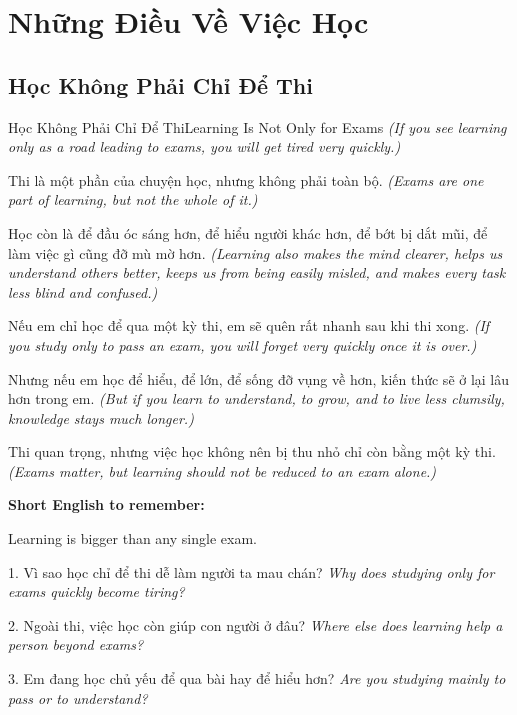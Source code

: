 \chapter{Những Điều Về Việc Học}

\section{Học Không Phải Chỉ Để Thi}
\begin{truyen}{Học Không Phải Chỉ Để Thi}{Learning Is Not Only for Exams}
\textit{(If you see learning only as a road leading to exams, you will get tired very quickly.)}

Thi là một phần của chuyện học, nhưng không phải toàn bộ.
\textit{(Exams are one part of learning, but not the whole of it.)}

Học còn là để đầu óc sáng hơn, để hiểu người khác hơn, để bớt bị dắt mũi, để làm việc gì cũng đỡ mù mờ hơn.
\textit{(Learning also makes the mind clearer, helps us understand others better, keeps us from being easily misled, and makes every task less blind and confused.)}

Nếu em chỉ học để qua một kỳ thi, em sẽ quên rất nhanh sau khi thi xong.
\textit{(If you study only to pass an exam, you will forget very quickly once it is over.)}

Nhưng nếu em học để hiểu, để lớn, để sống đỡ vụng về hơn, kiến thức sẽ ở lại lâu hơn trong em.
\textit{(But if you learn to understand, to grow, and to live less clumsily, knowledge stays much longer.)}
\end{truyen}

\begin{baihoc}
Thi quan trọng, nhưng việc học không nên bị thu nhỏ chỉ còn bằng một kỳ thi.
\textit{(Exams matter, but learning should not be reduced to an exam alone.)}
\end{baihoc}

\begin{ghinhoanh}
\textbf{Short English to remember:}

Learning is bigger than any single exam.

\end{ghinhoanh}

\begin{tuhocnhanh}
1. Vì sao học chỉ để thi dễ làm người ta mau chán? \textit{Why does studying only for exams quickly become tiring?}

2. Ngoài thi, việc học còn giúp con người ở đâu? \textit{Where else does learning help a person beyond exams?}

3. Em đang học chủ yếu để qua bài hay để hiểu hơn? \textit{Are you studying mainly to pass or to understand?}
\end{tuhocnhanh}
\ngancach

